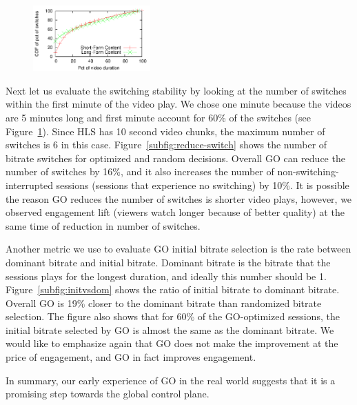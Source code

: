 \begin{figure}[h!]
\centering
 \includegraphics[width=0.4\textwidth] {figures/switch-time-dist.pdf}
\label{fig:switch-time-dist}
\end{figure}

Next let us evaluate the switching stability by looking at the number of switches within the first minute of the video play.
We chose one minute because the videos are 5 minutes long and first minute account for 60\% of the switches (see Figure~\ref{fig:switch-time-dist}). 
Since HLS has 10 second video chunks, the maximum number of switches is 6 in this case.
Figure~\ref{subfig:reduce-switch} shows the number of bitrate switches for optimized and random decisions. 
Overall GO can reduce the number of switches by 16\%, and it also increases the number of non-switching-interrupted sessions 
(sessions that experience no switching) by 10\%.
It is possible the reason GO reduces the number of switches is shorter video plays, however, we observed engagement lift
(viewers watch longer because of better quality) at the same time of reduction in number of switches.

Another metric we use to evaluate GO initial bitrate selection is the rate between dominant bitrate and initial bitrate. Dominant bitrate
is the bitrate that the sessions plays for the longest duration, and ideally this number should be 1. Figure~\ref{subfig:initvsdom} shows the 
ratio of initial bitrate to dominant bitrate. Overall GO is 19\% closer to the dominant bitrate than randomized bitrate selection. 
The figure also shows that for 60\% of the GO-optimized sessions, the initial bitrate selected by GO is almost the same as the dominant bitrate.
We would like to emphasize again that GO does not make the improvement at the price of engagement, and GO in fact improves engagement.

In summary, our early experience of GO in the real world suggests that it is a promising step towards the global control plane.
